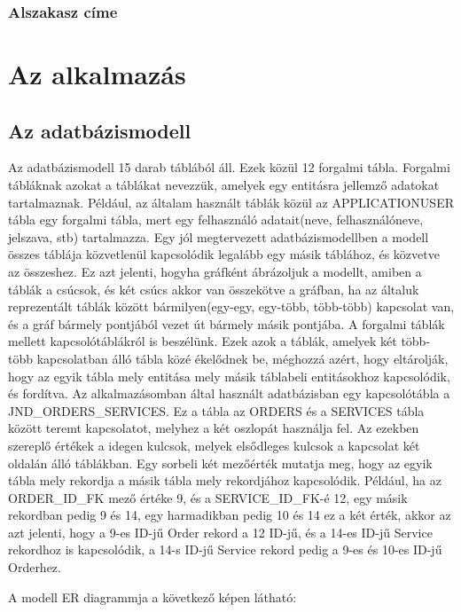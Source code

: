 \documentclass[centeredchapter]{thesis-ekf}
\theoremstyle{definition}
\theoremstyle{remark}
\begin{document}
\subsection{Alszakasz címe}

\chapter{Az alkalmazás}

\section{Az adatbázismodell}

Az adatbázismodell 15 darab táblából áll. Ezek közül 12 forgalmi tábla. Forgalmi tábláknak azokat a táblákat nevezzük, amelyek egy entitásra jellemző adatokat tartalmaznak. Például, az általam használt táblák közül az APPLICATIONUSER tábla egy forgalmi tábla, mert egy felhasználó adatait(neve, felhasználóneve, jelszava, stb) tartalmazza. Egy jól megtervezett adatbázismodellben a modell összes táblája közvetlenül kapcsolódik legalább egy másik táblához, és közvetve az összeshez. Ez azt jelenti, hogyha gráfként ábrázoljuk a modellt, amiben a táblák a csúcsok, és két csúcs akkor van összekötve a gráfban, ha az általuk reprezentált táblák között bármilyen(egy-egy, egy-több, több-több) kapcsolat van, és a gráf bármely pontjából vezet út bármely másik pontjába. A forgalmi táblák mellett kapcsolótáblákról is beszélünk. Ezek azok a táblák, amelyek két több-több kapcsolatban álló tábla közé ékelődnek be, méghozzá azért, hogy eltárolják, hogy az egyik tábla mely entitása mely másik táblabeli entitásokhoz kapcsolódik, és fordítva. Az alkalmazásomban által használt adatbázisban egy kapcsolótábla a JND\_ORDERS\_SERVICES. Ez a tábla az ORDERS és a SERVICES tábla között teremt kapcsolatot, melyhez a két oszlopát használja fel. Az ezekben szereplő értékek a idegen kulcsok, melyek elsődleges kulcsok a kapcsolat két oldalán álló táblákban. Egy sorbeli két mezőérték mutatja meg, hogy az egyik tábla mely rekordja a másik tábla mely rekordjához kapcsolódik. Például, ha az ORDER\_ID\_FK mező értéke 9, és a SERVICE\_ID\_FK-é 12, egy másik rekordban pedig 9 és 14, egy harmadikban pedig 10 és 14 ez a két érték, akkor az azt jelenti, hogy a 9-es ID-jű Order rekord a 12 ID-jű, és a 14-es ID-jű Service rekordhoz is kapcsolódik, a 14-s ID-jű Service rekord pedig a 9-es és 10-es ID-jű Orderhez.


A modell ER diagrammja a következő képen látható:
\end{document}
